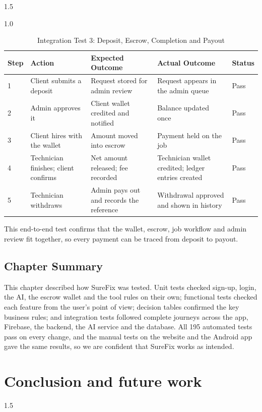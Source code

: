 \documentclass[A4paper,12pt]{report}
\theoremstyle{plain}
\theoremstyle{definition}
\theoremstyle{remark}
\numberwithin{equation}{section}
\begin{document}
\begin{spacing}{1.5}
\begin{table}[H]
\centering
\caption{Integration Test 3: Deposit, Escrow, Completion and Payout}
\begin{spacing}{1.0}
{\small
\begin{tabular}{|p{}|p{}|p{}|p{}|p{}|}
\hline
\textbf{Step} & \textbf{Action} & \textbf{Expected Outcome} & \textbf{Actual Outcome} & \textbf{Status} \\ \hline
1 & Client submits a deposit & Request stored for admin review & Request appears in the admin queue & Pass \\ \hline
2 & Admin approves it & Client wallet credited and notified & Balance updated once & Pass \\ \hline
3 & Client hires with the wallet & Amount moved into escrow & Payment held on the job & Pass \\ \hline
4 & Technician finishes; client confirms & Net amount released; fee recorded & Technician wallet credited; ledger entries created & Pass \\ \hline
5 & Technician withdraws & Admin pays out and records the reference & Withdrawal approved and shown in history & Pass \\ \hline
\end{tabular}}
\end{spacing}
\end{table}

This end-to-end test confirms that the wallet, escrow, job workflow and admin review fit together, so every payment can be traced from deposit to payout.

\section{Chapter Summary}

This chapter described how SureFix was tested. Unit tests checked sign-up, login, the AI, the escrow wallet and the tool rules on their own; functional tests checked each feature from the user's point of view; decision tables confirmed the key business rules; and integration tests followed complete journeys across the app, Firebase, the backend, the AI service and the database. All 195 automated tests pass on every change, and the manual tests on the website and the Android app gave the same results, so we are confident that SureFix works as intended.

\newpage

\chapter{Conclusion and future work}
\thispagestyle{empty}
\newpage
\begin{spacing}{1.5}


\end{spacing}
\end{spacing}
\end{document}
